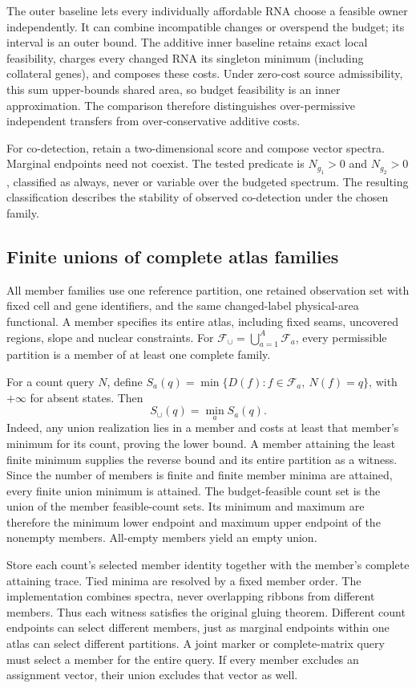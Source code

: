 \documentclass[10pt,letterpaper]{article}
\begin{document}
The outer baseline lets every individually affordable RNA choose a feasible owner independently. It can combine incompatible changes or overspend the budget; its interval is an outer bound. The additive inner baseline retains exact local feasibility, charges every changed RNA its singleton minimum (including collateral genes), and composes these costs. Under zero-cost source admissibility, this sum upper-bounds shared area, so budget feasibility is an inner approximation. The comparison therefore distinguishes over-permissive independent transfers from over-conservative additive costs.

For co-detection, retain a two-dimensional score and compose vector spectra. Marginal endpoints need not coexist. The tested predicate is $N_{g_1}>0$ and $N_{g_2}>0$, classified as always, never or variable over the budgeted spectrum. The resulting classification describes the stability of observed co-detection under the chosen family.

\FloatBarrier
\subsection{Finite unions of complete atlas families}\label{sec:union}
All member families use one reference partition, one retained observation set with fixed cell and gene identifiers, and the same changed-label physical-area functional. A member specifies its entire atlas, including fixed seams, uncovered regions, slope and nuclear constraints. For $\mathcal F_\cup=\bigcup_{a=1}^A\mathcal F_a$, every permissible partition is a member of at least one complete family.

For a count query $N$, define $S_a(q)=\min\{D(f):f\in\mathcal F_a,\ N(f)=q\}$, with $+\infty$ for absent states. Then
\[
 S_\cup(q)=\min_a S_a(q).
\]
Indeed, any union realization lies in a member and costs at least that member's minimum for its count, proving the lower bound. A member attaining the least finite minimum supplies the reverse bound and its entire partition as a witness. Since the number of members is finite and finite member minima are attained, every finite union minimum is attained. The budget-feasible count set is the union of the member feasible-count sets. Its minimum and maximum are therefore the minimum lower endpoint and maximum upper endpoint of the nonempty members. All-empty members yield an empty union.

Store each count's selected member identity together with the member's complete attaining trace. Tied minima are resolved by a fixed member order. The implementation combines spectra, never overlapping ribbons from different members. Thus each witness satisfies the original gluing theorem. Different count endpoints can select different members, just as marginal endpoints within one atlas can select different partitions. A joint marker or complete-matrix query must select a member for the entire query. If every member excludes an assignment vector, their union excludes that vector as well.
\end{document}
